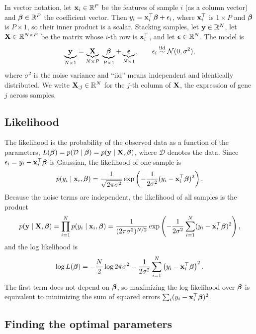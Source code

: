 In vector notation, let $\mathbf{x}_i\in\mathbb{R}^{P}$ be the features of sample $i$ (as a column vector) and $\boldsymbol{\beta}\in\mathbb{R}^P$ the coefficient vector. Then $y_i = \mathbf{x}_i^\top\boldsymbol{\beta} + \epsilon_i$, where $\mathbf{x}_i^\top$ is $1\times P$ and $\boldsymbol{\beta}$ is $P\times 1$, so their inner product is a scalar. Stacking samples, let $\mathbf{y}\in\mathbb{R}^N$, let $\mathbf{X}\in\mathbb{R}^{N\times P}$ be the matrix whose $i$-th row is $\mathbf{x}_i^\top$, and let $\boldsymbol{\epsilon}\in\mathbb{R}^N$. The model is
\begin{equation}
  \underbrace{\mathbf{y}}_{N\times 1} = \underbrace{\mathbf{X}}_{N\times P}\;\underbrace{\boldsymbol{\beta}}_{P\times 1} + \underbrace{\boldsymbol{\epsilon}}_{N\times 1}, \qquad \epsilon_i \overset{\text{iid}}{\sim} \mathcal{N}(0,\sigma^2),
  \label{eq:linreg}
\end{equation}
where $\sigma^2$ is the noise variance and ``iid'' means independent and identically distributed. We write $\mathbf{X}_{:j}\in\mathbb{R}^N$ for the $j$-th column of $\mathbf{X}$, the expression of gene $j$ across samples.

\subsection{Likelihood}

The likelihood is the probability of the observed data as a function of the parameters, $L(\boldsymbol{\beta})=p(\mathcal{D}\mid\boldsymbol{\beta})=p(\mathbf{y}\mid\mathbf{X},\boldsymbol{\beta})$, where $\mathcal{D}$ denotes the data. Since $\epsilon_i=y_i-\mathbf{x}_i^\top\boldsymbol{\beta}$ is Gaussian, the likelihood of one sample is
\begin{equation}
  p(y_i\mid\mathbf{x}_i,\boldsymbol{\beta}) = \frac{1}{\sqrt{2\pi\sigma^2}}\exp\left(-\frac{1}{2\sigma^2}(y_i-\mathbf{x}_i^\top\boldsymbol{\beta})^2\right).
\end{equation}
Because the noise terms are independent, the likelihood of all samples is the product
\begin{equation}
  p(\mathbf{y}\mid\mathbf{X},\boldsymbol{\beta}) = \prod_{i=1}^N p(y_i\mid\mathbf{x}_i,\boldsymbol{\beta}) = \frac{1}{(2\pi\sigma^2)^{N/2}}\exp\left(-\frac{1}{2\sigma^2}\sum_{i=1}^N(y_i-\mathbf{x}_i^\top\boldsymbol{\beta})^2\right),
\end{equation}
and the log likelihood is
\begin{equation}
  \log L(\boldsymbol{\beta}) = -\frac{N}{2}\log 2\pi\sigma^2 - \frac{1}{2\sigma^2}\sum_{i=1}^N\left(y_i-\mathbf{x}_i^\top\boldsymbol{\beta}\right)^2 .
  \label{eq:loglik}
\end{equation}
The first term does not depend on $\boldsymbol{\beta}$, so maximizing the log likelihood over $\boldsymbol{\beta}$ is equivalent to minimizing the sum of squared errors $\sum_i(y_i-\mathbf{x}_i^\top\boldsymbol{\beta})^2$.

\subsection{Finding the optimal parameters}

